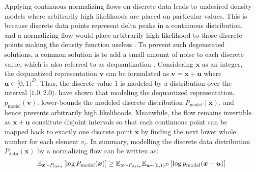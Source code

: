 Applying continuous normalizing flows on discrete data leads to undesired density models where arbitrarily high likelihoods are placed on particular values. This is because discrete data points represent delta peaks in a continuous distribution, and a normalizing flow would place arbitrarily high likelihood to those discrete points making the density function useless \cite{Theis2015, UriaContPeaks}. 
To prevent such degenerated solutions, a common solution is to add a small amount of noise to each discrete value, which is also referred to as dequantization \cite{RealNVP, Flow++, EmielDequantization}. 
Considering $\bm{x}$ as an integer, the dequantized representation $\bm{v}$ can be formulated as $\bm{v}=\bm{x}+\bm{u}$ where $\bm{u}\in[0,1)^D$. 
Thus, the discrete value $1$ is modeled by a distribution over the interval $[1.0, 2.0)$.   \citet{Theis2015} have shown that modeling the dequantized representation, $p_{\text{model}}(\bm{v})$, lower-bounds the modeled discrete distribution $P_{\text{model}}(\bm{x})$, and hence prevents arbitrarily high likelihoods. 
Meanwhile, the flow remains invertible as $\bm{x}+\bm{u}$ constitute disjoint intervals so that each continuous point can be mapped back to exactly one discrete point $\bm{x}$ by finding the next lower whole number for each element $v_i$. 
In summary, modelling the discrete data distribution $P_{\text{data}}(\bm{x})$ by a normalizing flow can be written as:
\begin{eqnarray}
    \label{eqn:related_work_dequantization_uniform}
    & & \mathbb{E}_{\bm{x}\sim P_{\text{data}}}\left[\log P_{\text{model}}(\bm{x})\right] \geq \mathbb{E}_{\bm{x}\sim P_{\text{data}}}\mathbb{E}_{\bm{u} \sim [0,1)^D}\left[\log p_{\text{model}}(\bm{x}+\bm{u})\right]
\end{eqnarray}


